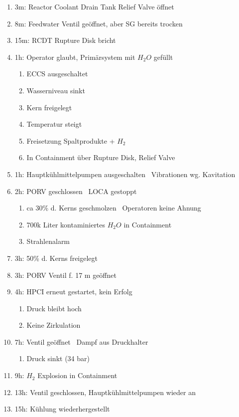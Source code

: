 \documentclass[12pt]{article}
\begin{document}
\begin{enumerate}
\begin{enumerate}[label = \textrightarrow]
		\end{enumerate}
	\item 3m: Reactor Coolant Drain Tank Relief Valve öffnet
	\item 8m: Feedwater Ventil geöffnet, aber SG bereits trocken
	\item 15m: RCDT Rupture Disk bricht
	\item 1h: Operator glaubt, Primärsystem mit \(H_2O\) gefüllt
		\begin{enumerate}[label = \textrightarrow]
			\item ECCS ausgeschaltet
			\item Wasserniveau sinkt
			\item Kern freigelegt
			\item Temperatur steigt
			\item Freisetzung Spaltprodukte + \(H_2\)
			\item In Containment über Rupture Disk, Relief Valve
		\end{enumerate}
	\item 1h: Hauptkühlmittelpumpen ausgeschalten \textrightarrow\ Vibrationen wg. Kavitation
	\item 2h: PORV geschlossen \textrightarrow\ LOCA gestoppt
		\begin{enumerate}[label = \textrightarrow]
			\item ca 30\% d. Kerns geschmolzen \textrightarrow\ Operatoren keine Ahnung
			\item 700k Liter kontaminiertes \(H_2O\) in Containment
			\item Strahlenalarm
		\end{enumerate}
	\item 3h: 50\% d. Kerns freigelegt
	\item 3h: PORV Ventil f. 17 m geöffnet
	\item 4h: HPCI erneut gestartet, kein Erfolg
		\begin{enumerate}[label = \textrightarrow]
			\item Druck bleibt hoch
			\item Keine Zirkulation
		\end{enumerate}
	\item 7h: Ventil geöffnet \textrightarrow\ Dampf aus Druckhalter
		\begin{enumerate}[label = \textrightarrow]
			\item Druck sinkt (34 bar)
		\end{enumerate}
	\item 9h: \(H_2\) Explosion in Containment
	\item 13h: Ventil geschlossen, Hauptkühlmittelpumpen wieder an
	\item 15h: Kühlung wiederhergestellt
\end{enumerate}
\end{document}

